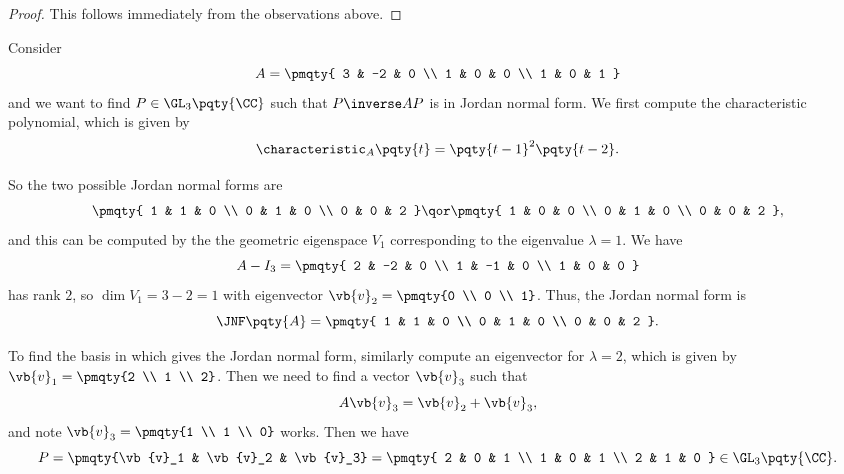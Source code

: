 \begin{proof}
    This follows immediately from the observations above.
\end{proof}

\begin{example}
    Consider
    \[
        A = \pmqty{
            3 & -2 & 0 \\
            1 & 0 & 0 \\
            1 & 0 & 1
        }
    \]
    and we want to find \(P \in \GL_3\pqty{\CC}\) such that \(P\inverse A P\) is in Jordan normal form. We first compute the characteristic polynomial, which is given by
    \[
        \characteristic_A \pqty{t} = \pqty{t - 1}^2 \pqty{t - 2}.
    \]

    So the two possible Jordan normal forms are
    \[
        \pmqty{
            1 & 1 & 0 \\
            0 & 1 & 0 \\
            0 & 0 & 2
        } \qor
        \pmqty{
            1 & 0 & 0 \\
            0 & 1 & 0 \\
            0 & 0 & 2
        },
    \]
    and this can be computed by the the geometric eigenspace \(V_1\) corresponding to the eigenvalue \(\lambda = 1\). We have
    \[
        A - I_3 = \pmqty{
            2 & -2 & 0 \\
            1 & -1 & 0 \\
            1 & 0 & 0
        }
    \]
    has rank \(2\), so \(\dim V_1 = 3 - 2 = 1\) with eigenvector \(\vb{v}_2 = \pmqty{0 \\ 0 \\ 1}\). Thus, the Jordan normal form is
    \[
        \JNF\pqty{A} = \pmqty{
            1 & 1 & 0 \\
            0 & 1 & 0 \\
            0 & 0 & 2
        }.
    \]

    To find the basis in which gives the Jordan normal form, similarly compute an eigenvector for \(\lambda = 2\), which is given by \(\vb{v}_1 = \pmqty{2 \\ 1 \\ 2}\). Then we need to find a vector \(\vb{v}_3\) such that
    \[
        A \vb{v}_3 = \vb{v}_2 + \vb{v}_3,
    \]
    and note \(\vb{v}_3 = \pmqty{1 \\ 1 \\ 0}\) works. Then we have
    \[
        P = \pmqty{\vb{v}_1 & \vb{v}_2 & \vb{v}_3} = \pmqty{
            2 & 0 & 1 \\
            1 & 0 & 1 \\
            2 & 1 & 0
        } \in \GL_3\pqty{\CC}.
    \]
\end{example}

